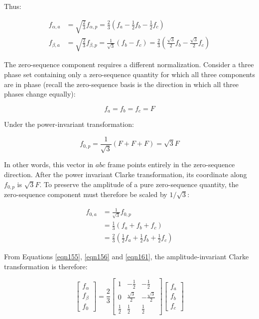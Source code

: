 \documentclass{article}
\begin{document}
Thus:

\begin{align}
\label{eqn155}
    f_{\alpha,a} &= \sqrt{\frac{2}{3}}f_{\alpha,p} = \frac{2}{3} \left( f_a - \frac{1}{2}f_b - \frac{1}{2}f_c \right) \\[4pt]
    f_{\beta,a} &= \sqrt{\frac{2}{3}}f_{\beta,p} = \frac{1}{\sqrt{3}}(f_b - f_c) = \frac{2}{3}(\frac{\sqrt{3}}{2}f_b - \frac{\sqrt{3}}{2}f_c)
\label{eqn156}
\end{align}

The zero-sequence component requires a different normalization. Consider a three phase set containing only a zero-sequence quantity for which all three components are in phase (recall the zero-sequence basis is the direction in which all three phases change equally):

\begin{equation}
    f_a = f_b = f_c = F
\end{equation}

Under the power-invariant transformation:

\begin{equation}
    f_{0,p} = \frac{1}{\sqrt{3}}(F + F + F) = \sqrt{3}F
\end{equation}

In other words, this vector in $abc$ frame points entirely in the zero-sequence direction. After the power invariant Clarke transformation, its coordinate along $f_{0,p}$ is $\sqrt{3}F$. To preserve the amplitude of a pure zero-sequence quantity, the zero-sequence component must therefore be scaled by $1/\sqrt{3}$:

\begin{align}
    f_{0,a}
    &= \frac{1}{\sqrt{3}}f_{0,p} \\[2mm]
    &= \frac{1}{3}(f_a + f_b + f_c) \\[2mm]
    &= \frac{2}{3}(\frac{1}{2}f_a + \frac{1}{2}f_b + \frac{1}{2}f_c)
\label{eqn161}
\end{align}

From Equations \ref{eqn155}, \ref{eqn156} and \ref{eqn161}, the amplitude-invariant Clarke transformation is therefore:

\begin{equation}
    \begin{bmatrix}
        f_{\alpha} \\
        f_{\beta} \\
        f_0
    \end{bmatrix}
    =
    \frac{2}{3}
    \begin{bmatrix}
        1 & -\frac{1}{2} & -\frac{1}{2} \\[2mm]
        0 & \frac{\sqrt{3}}{2} & -\frac{\sqrt{3}}{2} \\[2mm]
        \frac{1}{2} & \frac{1}{2} & \frac{1}{2}
    \end{bmatrix}
    \begin{bmatrix}
        f_a \\
        f_b \\
        f_c
    \end{bmatrix}
\end{equation}
\end{document}
